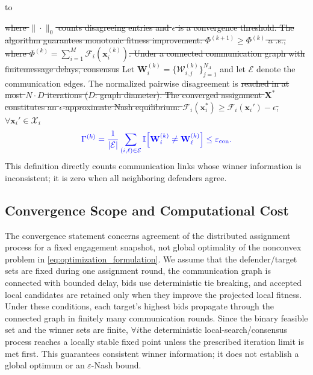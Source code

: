 \documentclass[lettersize,journal]{IEEEtran}
\providecommand{\DIFadd}[1]{{\protect\color{blue}#1}} %
\providecommand{\DIFdel}[1]{{\protect\color{red}\sout{#1}}}                      %
\newcommand{\DIFdelDISPLAY}[1]{%
  \par\addvspace{4pt}%
  \sbox{\DIFDELbox}{$\displaystyle\color{red}\begin{aligned}#1\end{aligned}$}%
  \noindent\hbox to\hsize{\hfil %
    \rlap{\usebox{\DIFDELbox}}%
    \raisebox{\dimexpr(\ht\DIFDELbox-\dp\DIFDELbox)/2\relax}[0pt][0pt]{\textcolor{red}{\rule{\wd\DIFDELbox}{0.6pt}}}%
    \hfil}%
  \par\addvspace{4pt}%
} %
\providecommand{\DIFaddbegin}{} %
\providecommand{\DIFaddend}{} %
\providecommand{\DIFdelbegin}{} %
\providecommand{\DIFdelend}{} %
\newcommand{\DIFscaledelfig}{0.5}
\newlength{\DIFdelgraphicswidth} %
\newlength{\DIFdelgraphicsheight} %
\newcommand{\DIFaddincludegraphics}[2][]{{\color{blue}\fbox{\DIFOincludegraphics[#1]{#2}}}} %
\newcommand{\DIFdelincludegraphics}[2][]{%
\sbox{\DIFdelgraphicsbox}{\DIFOincludegraphics[#1]{#2}}%
\settoboxwidth{\DIFdelgraphicswidth}{\DIFdelgraphicsbox} %
\settoboxtotalheight{\DIFdelgraphicsheight}{\DIFdelgraphicsbox} %
\scalebox{\DIFscaledelfig}{%
\parbox[b]{\DIFdelgraphicswidth}{\usebox{\DIFdelgraphicsbox}\\[-\baselineskip] \rule{\DIFdelgraphicswidth}{0em}}\llap{\resizebox{\DIFdelgraphicswidth}{\DIFdelgraphicsheight}{%
\setlength{\unitlength}{\DIFdelgraphicswidth}%
\begin{picture}(1,1)%
\thicklines\linethickness{2pt} %
{\color[rgb]{1,0,0}\put(0,0){\framebox(1,1){}}}%
{\color[rgb]{1,0,0}\put(0,0){\line( 1,1){1}}}%
{\color[rgb]{1,0,0}\put(0,1){\line(1,-1){1}}}%
\end{picture}%
}\hspace*{3pt}}} %
} %
\DeclareRobustCommand{\DIFaddbegin}{\DIFOaddbegin \let\includegraphics\DIFaddincludegraphics} %
\DeclareRobustCommand{\DIFaddend}{\DIFOaddend \let\includegraphics\DIFOincludegraphics} %
\DeclareRobustCommand{\DIFdelbegin}{\DIFOdelbegin \let\includegraphics\DIFdelincludegraphics} %
\DeclareRobustCommand{\DIFdelend}{\DIFOaddend \let\includegraphics\DIFOincludegraphics} %
\begin{document}
\DIFdelDISPLAY{%
\Gamma^{(k)} = \frac{1}{M} \sum_{i=1}^{M} \left\| \mathbf{z}_i^{(k)} - \frac{1}{|\mathcal{N}_i|} \sum_{j \in \mathcal{N}_i} \mathbf{z}_j^{(k)} \right\|_0 < \epsilon
}
\DIFdel{where $\|\cdot\|_0$ counts disagreeing entries and $\epsilon$ is a convergence threshold.
The algorithm guarantees monotonic fitness improvement: $\Phi^{(k+1)} \geq \Phi^{(k)}$ a
.s., where $\Phi^{(k)} = \sum_{i=1}^{M} \mathcal{F}_i(\mathbf{x}_i^{(k)})$. Under a connected communication graph with finitemessage delays, consensus }\DIFdelend \DIFaddbegin \DIFadd{Let $\mathbf W_i^{(k)}=\{\mathcal W_{i,j}^{(k)}\}_{j=1}^{N_A}$ and let
$\mathcal E$ denote the communication edges. The normalized pairwise disagreement }\DIFaddend is
\DIFdelbegin \DIFdel{reached in at most $N \cdot D$ iterations ($D$: graph diameter). The converged assignment $\mathbf{X}^*$ constitutes an
$\epsilon$-approximate Nash equilibrium: $\mathcal{F}_i(\mathbf{x}_i^*) \geq \mathcal{F}_i(\mathbf{x}_i') - \epsilon$, $\forall \mathbf{x}_i' \in \mathcal{X}_i$}\DIFdelend \DIFaddbegin \begin{equation}
\DIFadd{\label{eq:convergence}
\Gamma^{(k)}=\frac{1}{|\mathcal E|}
\sum_{(i,\ell)\in\mathcal E}
\mathbb I\!\left[\mathbf W_i^{(k)}\neq\mathbf W_{\ell}^{(k)}\right]
\leq\varepsilon_{\mathrm{con}}.
}\end{equation}
\DIFadd{This definition directly counts communication links whose winner information is inconsistent;
it is zero when all neighboring defenders agree.
}

\subsection{\DIFadd{Convergence Scope and Computational Cost}}
\label{subsec:convergence_equilibrium}

\DIFadd{The convergence statement concerns agreement of the distributed assignment process for a
fixed engagement snapshot, not global optimality of the nonconvex problem in
}\eqref{eq:optimization_formulation}\DIFadd{. We assume that the defender/target sets are fixed during
one assignment round, the communication graph is connected with bounded delay, bids use
deterministic tie breaking, and accepted local candidates are retained only when they improve
the projected local fitness. Under these conditions, each target's highest bids propagate
through the connected graph in finitely many communication rounds. Since the binary feasible
set and the winner sets are finite}\DIFaddend , \DIFdelbegin \DIFdel{$\forall i$}\DIFdelend \DIFaddbegin \DIFadd{the deterministic local-search/consensus process reaches a
locally stable fixed point unless the prescribed iteration limit is met first. This guarantees
consistent winner information; it does not establish a global optimum or an
$\varepsilon$-Nash bound}\DIFaddend .
\end{document}
